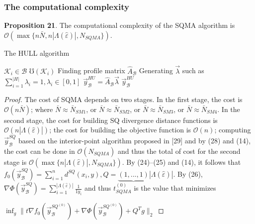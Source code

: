 \documentclass[]{iosart2c}
\begin{document}
    \subsubsection{The computational complexity}

    \textbf{Proposition 21}. The computational complexity of the
    SQMA algorithm is $\mathcal{O}(\max\{n \bar{N}, n|\Lambda(\hat{\varepsilon})|,N_{SQMA} \})$.

    \begin{algorithm}
        \caption{The HULL algorithm}
        \begin{algorithmic}[1]
            \For
                $\mathcal{K}_i \in \mathcal{B}$
                \State $\mho(\mathcal{K}_i)$
            \EndFor
            \State Finding profile matrix $\hat{A}_\mathcal{B}$
            \State Generating $\vec{\lambda}$ such as $\sum^|H|_{i=1} \lambda_i = 1, \lambda_i \in [0, 1]$
            \State $\vec{y}^{HU}_\mathcal{B} = \hat{A}_\mathcal{B} \vec{\lambda}$
            \State \Return $\vec{y}^{HU}_\mathcal{B}$
        \end{algorithmic}
    \end{algorithm}

    \begin{proof}
        The cost of SQMA depends on two stages. In
        the first stage, the cost is $\mathcal{O}(n\bar N)$; where $\bar N \approx \bar N_{SM1}$, or $\bar N \approx \bar N_{SM2}$, or $\bar N \approx \bar N_{SM3}$, or $\bar N \approx \bar N_{SM4}$. In the
        second stage, the cost for building SQ divergence distance
        functions is $\mathcal{O}(n |\Lambda(\hat{\varepsilon})|)$; the cost for building
        the objective function is $\mathcal{O}(n)$; computing $\vec{y}^{SQ}_\mathcal{B}$ based
        on the interior-point algorithm proposed in [29] and
        by (28) and (14), the cost can be done in $\mathcal{O}(N_{SQMA})$
        and thus the total of cost for the second stage is
        $\mathcal{O}(\max\{n |\Lambda(\hat{\varepsilon})|,N_{SQMA}\})$. By (24)–(25) and (14),
        it follows that $f_0 \left( \vec{y}^{SQ}_\mathcal{B} \right) = \sum^n_{i=1} d^{SQ}(x_i, y), Q = \underbrace{(1, ... , 1)}{|\Lambda(\hat{\varepsilon})|}$. By (26), $\nabla \Phi \left( \vec{y}^{SQ}_\mathcal{B} \right) = \sum^{|\Lambda(\hat{\varepsilon})|}_{i=1} \frac{1}{1
        y_i}$
        and
        thus $t^{(0)}_{SQMA}$ is the value that minimizes

        $\inf_g\parallel t\nabla f_0 \left( \vec{y}^{SQ^{(0)}}_\mathcal{B} \right) +\nabla \Phi \left( \vec{y}^{SQ^{(0)}}_\mathcal{B} \right) + Q^T g \parallel_2$
    \end{proof}
\end{document}
